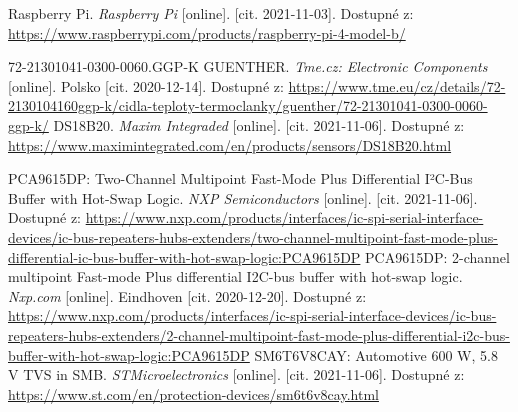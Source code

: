 \begin{thebibliography}{3}
Raspberry Pi. \textit{Raspberry Pi} [online]. [cit. 2021-11-03]. Dostupné z: \url{https://www.raspberrypi.com/products/raspberry-pi-4-model-b/}

72-21301041-0300-0060.GGP-K GUENTHER. \textit{Tme.cz: Electronic Components} [online]. Polsko [cit. 2020-12-14]. Dostupné z: \url{https://www.tme.eu/cz/details/72-2130104160ggp-k/cidla-teploty-termoclanky/guenther/72-21301041-0300-0060-ggp-k/}
DS18B20. \textit{Maxim Integraded} [online]. [cit. 2021-11-06]. Dostupné z: \url{https://www.maximintegrated.com/en/products/sensors/DS18B20.html}

PCA9615DP: Two-Channel Multipoint Fast-Mode Plus Differential I²C-Bus Buffer with Hot-Swap Logic. \textit{NXP Semiconductors} [online]. [cit. 2021-11-06]. Dostupné z: \url{https://www.nxp.com/products/interfaces/ic-spi-serial-interface-devices/ic-bus-repeaters-hubs-extenders/two-channel-multipoint-fast-mode-plus-differential-ic-bus-buffer-with-hot-swap-logic:PCA9615DP}
PCA9615DP: 2-channel multipoint Fast-mode Plus differential I2C-bus buffer with hot-swap logic. \textit{Nxp.com} [online]. Eindhoven [cit. 2020-12-20]. Dostupné z: \url{https://www.nxp.com/products/interfaces/ic-spi-serial-interface-devices/ic-bus-repeaters-hubs-extenders/2-channel-multipoint-fast-mode-plus-differential-i2c-bus-buffer-with-hot-swap-logic:PCA9615DP}
SM6T6V8CAY: Automotive 600 W, 5.8 V TVS in SMB. \textit{STMicroelectronics} [online]. [cit. 2021-11-06]. Dostupné z: \url{https://www.st.com/en/protection-devices/sm6t6v8cay.html}



\end{thebibliography}
